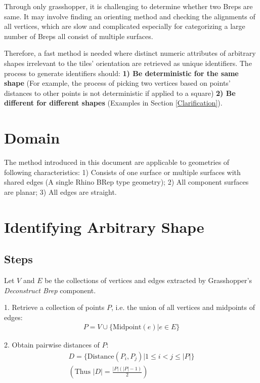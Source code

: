 \documentclass{article}
\begin{document}
Through only grasshopper, it is challenging to determine whether two Breps are same. It may involve finding an orienting method and checking the alignments of all vertices, which are slow and complicated especially for categorizing a large number of Breps all consist of multiple surfaces.

Therefore, a fast method is needed where distinct numeric attributes of arbitrary shapes irrelevant to the tiles' orientation are retrieved as unique identifiers. The process to generate identifiers should: \textbf{1) Be deterministic for the same shape} (For example, the process of picking two vertices based on points' distances to other points is not deterministic if applied to a square) \textbf{2) Be different for different shapes} (Examples in Section \ref{Clarification}).

\section{Domain}

The method introduced in this document are applicable to geometries of following characteristics: 1) Consists of one surface or multiple surfaces with shared edges (A single Rhino BRep type geometry); 2) All component surfaces are planar; 3) All edges are straight.

\section{Identifying Arbitrary Shape} \label{IdentifyShape}

\subsection{Steps}

\noindent

Let $V$ and $E$ be the collections of vertices and edges extracted by Grasshopper's \textit{Deconstruct Brep} component.

1. Retrieve a collection of points $P$, i.e. the union of all vertices and midpoints of edges:
\begin{align*}
	P = V \cup \{\text{Midpoint}(e) | e \in E \}
\end{align*}

2. Obtain pairwise distances of $P$:
\begin{gather*}
	D = \{\text{Distance}(P_i, P_j) | 1 \leq i < j \leq |P| \} \\
	(\text{Thus } |D| = \frac{|P|(|P| - 1)}{2})
\end{gather*}
\end{document}
